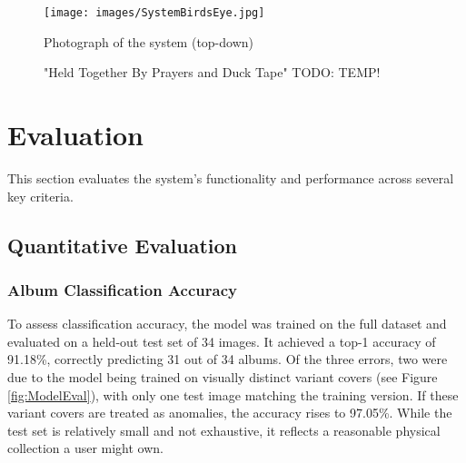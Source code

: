             \begin{figure}
                \centering
                \texttt{[image: images/SystemBirdsEye.jpg]}
                \caption{Photograph of the system (top-down)}
                \label{fig:SystemTopDown}
                \caption*{"Held Together By Prayers and Duck Tape" TODO: TEMP!}
            \end{figure}
    
    \section{Evaluation}
    
        This section evaluates the system’s functionality and performance across several key criteria.
        
        \subsection{Quantitative Evaluation}
    
            \subsubsection{Album Classification Accuracy}
    
                To assess classification accuracy, the model was trained on the full dataset and evaluated on a held-out test set of 34 images. It achieved a top-1 accuracy of 91.18\%, correctly predicting 31 out of 34 albums. Of the three errors, two were due to the model being trained on visually distinct variant covers (see Figure \ref{fig:ModelEval}), with only one test image matching the training version. If these variant covers are treated as anomalies, the accuracy rises to 97.05\%. While the test set is relatively small and not exhaustive, it reflects a reasonable physical collection a user might own.
    
